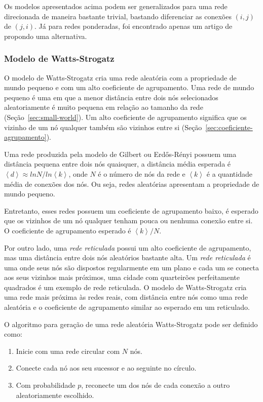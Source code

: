 \documentclass[12pt,a4paper]{article}
\theoremstyle{hypo}
\newcommand{\avg}[1]{\left\langle #1 \right\rangle} %
\begin{document}
Os modelos apresentados acima podem ser generalizados para uma rede direcionada de maneira bastante trivial, bastando diferenciar as conexões $(i, j)$ de $(j, i)$. Já para redes ponderadas, foi encontrado apenas um artigo de  propondo uma alternativa.

\subsubsection{Modelo de Watts-Strogatz}

O modelo de Watts-Strogatz cria uma rede aleatória com a propriedade de mundo pequeno e com um alto coeficiente de agrupamento. Uma rede de mundo pequeno é uma em que a menor distância entre dois nós selecionados aleatoriamente é muito pequena em relação ao tamanho da rede (Seção~\ref{sec:small-world}). Um alto coeficiente de agrupamento significa que os vizinho de um nó qualquer também são vizinhos entre si (Seção~\ref{sec:coeficiente-agrupamento}).

Uma rede produzida pela modelo de Gilbert ou Erdős-Rényi possuem uma distância pequena entre dois nós quaisquer, a distância média esperada é $\avg{d} \approx ln N / ln \avg{k}$, onde $N$ é o número de nós da rede e $\avg{k}$ é a quantidade média de conexões dos nós. Ou seja, redes aleatórias apresentam a propriedade de mundo pequeno.

Entretanto, esses redes possuem um coeficiente de agrupamento baixo, é esperado que os vizinhos de um nó qualquer tenham pouca ou nenhuma conexão entre si. O coeficiente de agrupamento esperado é $\avg{k}/N$.

Por outro lado, uma \textit{rede reticulada} possui um alto coeficiente de agrupamento, mas uma distância entre dois nós aleatórios bastante alta. Um \textit{rede reticulada} é uma onde seus nós são dispostos regularmente em um plano e cada um se conecta aos seus vizinhos mais próximos, uma cidade com quarteirões perfeitamente quadrados é um exemplo de rede reticulada. O modelo de Watts-Strogatz cria uma rede mais próxima às redes reais, com distância entre nós como uma rede aleatória e o coeficiente de agrupamento similar ao esperado em um reticulado.

O algoritmo para geração de uma rede aleatória Watts-Strogatz pode ser definido como:

\begin{enumerate}
\item Inicie com uma rede circular com $N$ nós.

\item Conecte cada nó aos seu sucessor e ao seguinte no círculo.

\item Com probabilidade $p$, reconecte um dos nós de cada conexão a outro aleatoriamente escolhido.
\end{enumerate}
\end{document}

